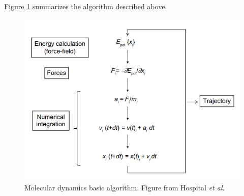 Figure \ref{fig:md_algo} summarizes the algorithm described above. 
\begin{figure}[h]
    \centering
    \includegraphics[scale=0.5]{Figures/Chapter2/md_algorithm.png}
    \caption{Molecular dynamics basic algorithm. Figure from Hospital \textit{et al.} \cite{hospital2015molecular}}
    \label{fig:md_algo}
\end{figure}

